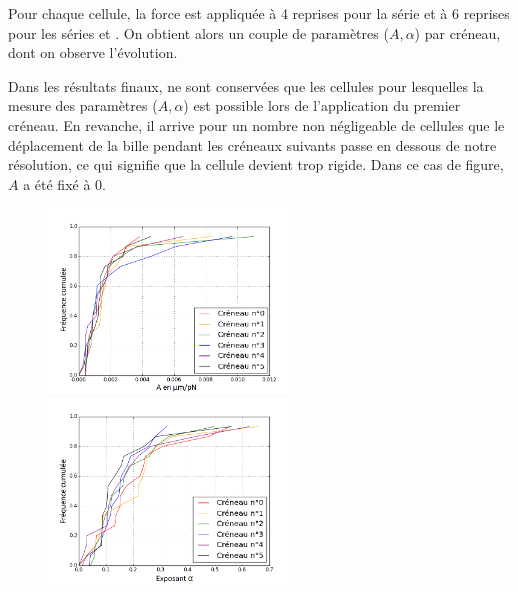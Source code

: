 Pour chaque cellule, la force est appliquée à 4 reprises pour la série  et à 6 reprises pour les séries  et . On obtient alors un couple de paramètres ($A,\alpha$) par créneau, dont on observe l'évolution. 

Dans les résultats finaux, ne sont conservées que les cellules pour lesquelles la mesure des paramètres ($A, \alpha$) est possible lors de l'application du premier créneau. 
En revanche, il arrive pour un nombre non négligeable de cellules que le déplacement de la bille pendant les créneaux suivants passe en dessous de notre résolution, ce qui signifie que la cellule devient trop rigide. Dans ce cas de figure, $A$ a été fixé à 0. 
\begin{center}
\begin{figure}[p]
\includegraphics[width=6.5cm]{Figures/A_creneaux_temoin.png}
\includegraphics[width=6.5cm]{Figures/E_creneaux_temoin.png} 


\end{figure}
\end{center}
